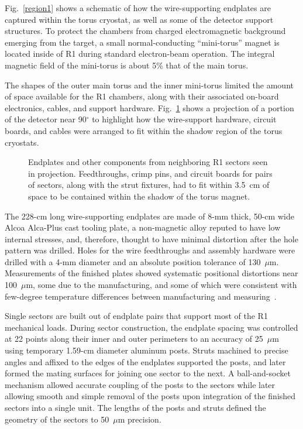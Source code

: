 Fig.~\ref{region1} shows a schematic of how the wire-supporting endplates are 
captured within the torus cryostat, as well as some of the detector support 
structures.  To protect the chambers from charged electromagnetic background 
emerging from the target, a small normal-conducting ``mini-torus'' magnet is 
located inside of R1 during standard electron-beam operation.  The integral 
magnetic field of the mini-torus is about 5$\%$ that of the main torus.  

The shapes of the outer main torus and the inner mini-torus limited the
amount of space available for the R1 chambers, along with their associated 
on-board electronics, cables, and support hardware.  Fig.~\ref{xsect} shows a 
projection of a portion of the detector near 90$^{\circ}$ to highlight how the 
wire-support hardware, circuit boards, and cables were arranged to fit within 
the shadow region of the torus cryostats.

\begin{figure}[htpb]   
\vspace{9.5cm}
\caption{\small{Endplates and other components from neighboring R1 sectors 
seen in projection.  Feedthroughs, crimp pins, and circuit boards for 
pairs of sectors, along with the strut fixtures, had to fit within 
3.5~cm of space to be contained within the shadow of the torus magnet.}}
\label{xsect}
\end{figure}   

The 228-cm long wire-supporting endplates are made of 8-mm thick, 50-cm wide
Alcoa Alca-Plus cast tooling plate, a non-magnetic alloy reputed to have low 
internal stresses, and, therefore, thought to have minimal distortion after the 
hole pattern was drilled.  Holes for the wire feedthroughs and assembly 
hardware were drilled with a 4-mm diameter and an absolute position tolerance 
of 130~$\mu$m.  Measurements of the finished plates showed systematic positional 
distortions near 100~$\mu$m, some due to the manufacturing, and some of which 
were consistent with few-degree temperature differences between manufacturing 
and measuring~\cite{ereport}.

Single sectors are built out of endplate pairs that support most of the R1
mechanical loads.  During sector construction, the endplate spacing was 
controlled at 22 points along their inner and outer perimeters to an accuracy of 
25~$\mu$m using temporary 1.59-cm diameter aluminum posts.  Struts machined to 
precise angles and affixed to the edges of the endplates supported the posts, 
and later formed the mating surfaces for joining one sector to the next.  A 
ball-and-socket mechanism allowed accurate coupling of the posts to the sectors 
while later allowing smooth and simple removal of the posts upon integration of 
the finished sectors into a single unit.  The lengths of the posts and struts
defined the geometry of the sectors to 50~$\mu$m precision.

